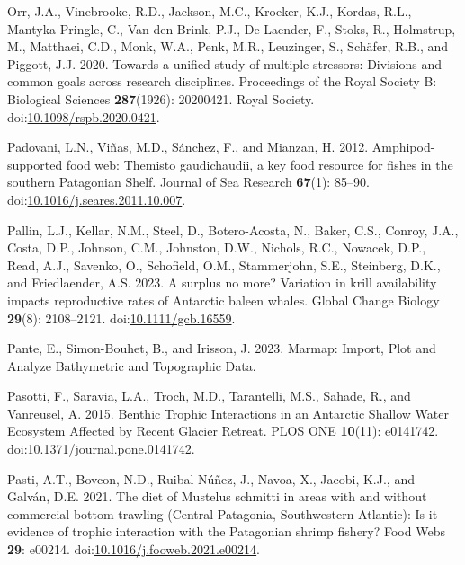 \documentclass[
]{article}
\newlength{\cslhangindent}
\newenvironment{CSLReferences}[2] %
 {\begin{list}{}{%
  \setlength{\itemindent}{0pt}
  \setlength{\leftmargin}{0pt}
  \setlength{\parsep}{0pt}
  \ifodd #1
   \setlength{\leftmargin}{\cslhangindent}
   \setlength{\itemindent}{-1\cslhangindent}
  \fi
  \setlength{\itemsep}{#2\baselineskip}}}
 {\end{list}}
\begin{document}
\begin{CSLReferences}{1}{0}
Orr, J.A., Vinebrooke, R.D., Jackson, M.C., Kroeker, K.J., Kordas, R.L.,
Mantyka-Pringle, C., Van den Brink, P.J., De Laender, F., Stoks, R.,
Holmstrup, M., Matthaei, C.D., Monk, W.A., Penk, M.R., Leuzinger, S.,
Schäfer, R.B., and Piggott, J.J. 2020. Towards a unified study of
multiple stressors: Divisions and common goals across research
disciplines. Proceedings of the Royal Society B: Biological Sciences
\textbf{287}(1926): 20200421. Royal Society.
doi:\href{https://doi.org/10.1098/rspb.2020.0421}{10.1098/rspb.2020.0421}.

Padovani, L.N., Viñas, M.D., Sánchez, F., and Mianzan, H. 2012.
Amphipod-supported food web: {Themisto} gaudichaudii, a key food
resource for fishes in the southern {Patagonian Shelf}. Journal of Sea
Research \textbf{67}(1): 85--90.
doi:\href{https://doi.org/10.1016/j.seares.2011.10.007}{10.1016/j.seares.2011.10.007}.

Pallin, L.J., Kellar, N.M., Steel, D., Botero-Acosta, N., Baker, C.S.,
Conroy, J.A., Costa, D.P., Johnson, C.M., Johnston, D.W., Nichols, R.C.,
Nowacek, D.P., Read, A.J., Savenko, O., Schofield, O.M., Stammerjohn,
S.E., Steinberg, D.K., and Friedlaender, A.S. 2023. A surplus no more?
{Variation} in krill availability impacts reproductive rates of
{Antarctic} baleen whales. Global Change Biology \textbf{29}(8):
2108--2121.
doi:\href{https://doi.org/10.1111/gcb.16559}{10.1111/gcb.16559}.

Pante, E., Simon-Bouhet, B., and Irisson, J. 2023. Marmap: {Import},
{Plot} and {Analyze Bathymetric} and {Topographic Data}.

Pasotti, F., Saravia, L.A., Troch, M.D., Tarantelli, M.S., Sahade, R.,
and Vanreusel, A. 2015. Benthic {Trophic Interactions} in an {Antarctic
Shallow Water Ecosystem Affected} by {Recent Glacier Retreat}. PLOS ONE
\textbf{10}(11): e0141742.
doi:\href{https://doi.org/10.1371/journal.pone.0141742}{10.1371/journal.pone.0141742}.

Pasti, A.T., Bovcon, N.D., Ruibal-Núñez, J., Navoa, X., Jacobi, K.J.,
and Galván, D.E. 2021. The diet of {Mustelus} schmitti in areas with and
without commercial bottom trawling ({Central Patagonia}, {Southwestern
Atlantic}): {Is} it evidence of trophic interaction with the
{Patagonian} shrimp fishery? Food Webs \textbf{29}: e00214.
doi:\href{https://doi.org/10.1016/j.fooweb.2021.e00214}{10.1016/j.fooweb.2021.e00214}.


\end{CSLReferences}
\end{document}

